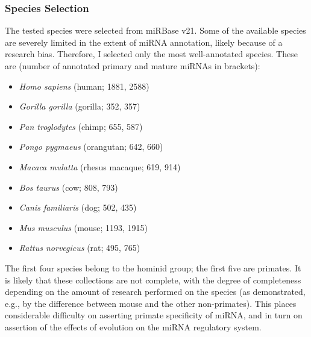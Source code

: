 \begin{method}

\subsubsection{Species Selection}
The tested species were selected from miRBase v21. Some of the available species are severely limited in the extent of miRNA annotation, likely because of a research bias. Therefore, I selected only the most well-annotated species. These are (number of annotated primary and mature miRNAs in brackets):
\begin{itemize}[noitemsep, leftmargin=.5cm, label={\tiny\raisebox{1ex}{\textbullet}}]
\item \emph{Homo sapiens} (human; 1881, 2588)
\item \emph{Gorilla gorilla} (gorilla; 352, 357)
\item \emph{Pan troglodytes} (chimp; 655, 587)
\item \emph{Pongo pygmaeus} (orangutan; 642, 660)
\item \emph{Macaca mulatta} (rhesus macaque; 619, 914)
\item \emph{Bos taurus} (cow; 808, 793)
\item \emph{Canis familiaris} (dog; 502, 435)
\item \emph{Mus musculus} (mouse; 1193, 1915)
\item \emph{Rattus norvegicus} (rat; 495, 765)
\end{itemize}
The first four species belong to the hominid group; the first five are primates. It is likely that these collections are not complete, with the degree of completeness depending on the amount of research performed on the species (as demonstrated, e.g., by the difference between mouse and the other non-primates). This places considerable difficulty on asserting primate specificity of miRNA, and in turn on assertion of the effects of evolution on the miRNA regulatory system.


\end{method}
